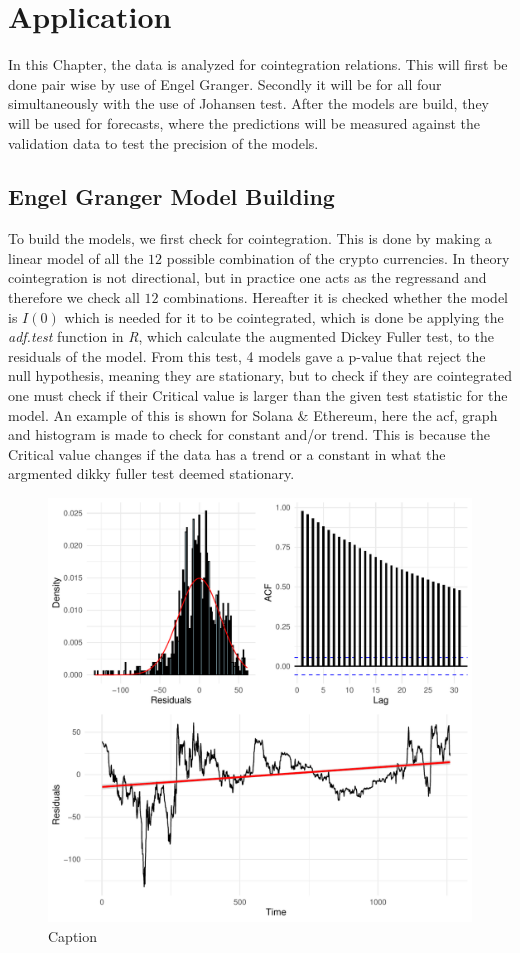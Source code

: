 \chapter{Application}
In this Chapter, the data is analyzed for cointegration relations. This will first be done pair wise by use of Engel Granger. Secondly it will be for all four simultaneously with the use of Johansen test. After the models are build, they will be used for forecasts, where the predictions will be measured against the validation data to test the precision of the models.


\section{Engel Granger Model Building}
To build the models, we first check for cointegration. This is done by making a linear model of all the $12$ possible combination of the crypto currencies. In theory cointegration is not directional, but in practice one acts as the regressand and therefore we check all $12$ combinations. Hereafter it is checked whether the model is $I(0)$ which is needed for it to be cointegrated, which is done be applying the \textit{adf.test} function in \textit{R}, which calculate the augmented Dickey Fuller test, to the residuals of the model. From this test, 4 models gave a p-value that reject the null hypothesis, meaning they are stationary, but to check if they are cointegrated one must check if their Critical value is larger than the given test statistic for the model. An example of this is shown for Solana & Ethereum, here the acf, graph and histogram is made to check for constant and/or trend. This is because the Critical value changes if the data has a trend or a constant in what the argmented dikky fuller test deemed stationary.
\begin{figure}
    \centering
    \includegraphics[width=0.4\linewidth]{1.Projekt_kode/Billeder/plot_grid_ADF_Solana-Ethereum.pdf}
    \caption{Caption}
    \label{fig:enter-label}
\end{figure}

